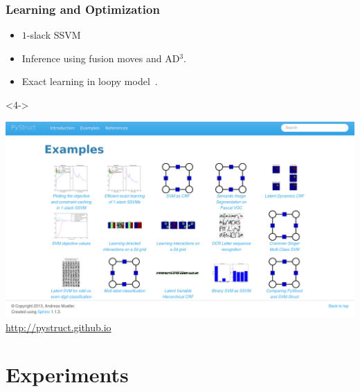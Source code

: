 \documentclass[final,ignorenonframetext,compress]{beamer}
\begin{document}
    \begin{frame}
        \frametitle{Learning and Optimization}
        \begin{itemize}
            \item $1$-slack SSVM
            \item<2-> Inference using fusion moves and AD$^3$.
            \item<3-> Exact learning in loopy model~\citep{mueller2014_exact}.
        \end{itemize}
        \begin{visibleenv}<4->
            \begin{center}
                \includegraphics[width=.5\linewidth]{images/example_gallery}\\
                \url{http://pystruct.github.io}
            \end{center}
        \end{visibleenv}
    \end{frame}


    \section{Experiments}
    
\end{document}
